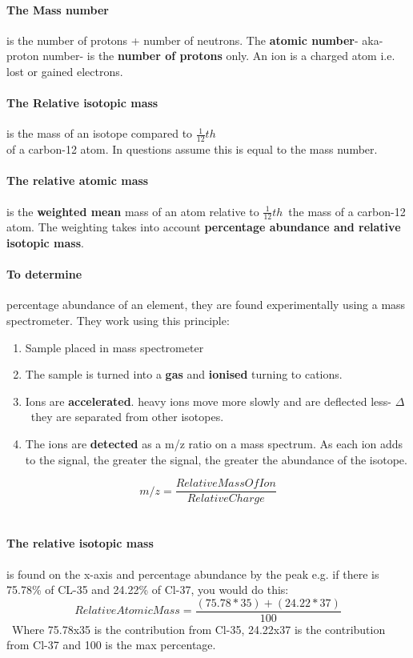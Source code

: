 \paragraph{The Mass number} is the number of protons + number of neutrons. The \textbf{atomic number}- aka- proton number- is the \textbf{number of protons} only.
An ion is a charged atom i.e. lost or gained electrons.
\paragraph{The Relative isotopic mass}is the mass of an isotope compared to \(\frac{1}{12}th\)\\ of a carbon-12 atom. In questions assume this is equal to the mass number.
\paragraph{The relative atomic mass}is the \textbf{weighted mean} mass of an atom relative to  \(\frac{1}{12}th\)\ the mass of a carbon-12 atom. The weighting takes into account \textbf{percentage abundance and relative isotopic mass}. 

\paragraph{To determine} percentage abundance of an element, they are found experimentally using a mass spectrometer. They work using this principle:
\begin{enumerate}
  \item Sample placed in mass spectrometer
  \item The sample is turned into a \textbf{gas} and \textbf{ionised} turning to cations.
  \item Ions are \textbf{accelerated}. heavy ions move more slowly and are deflected less- \(\Delta\)\ they are separated from other isotopes.
  \item The ions are \textbf{detected} as a m/z ratio on a mass spectrum. As each ion adds to the signal, the greater the signal, the greater the abundance of the isotope.
\end{enumerate}
\[m/z= \frac{Relative Mass Of Ion}{Relative Charge}\]\
\paragraph{The relative isotopic mass} is found on the x-axis and percentage abundance by the peak e.g. if there is 75.78\% of CL-35 and 24.22\% of Cl-37, you would do this:
\[Relative Atomic Mass=\frac{(75.78*35)+(24.22*37)}{100}\]\
Where 75.78x35 is the contribution from Cl-35, 24.22x37 is the contribution from Cl-37 and 100 is the max percentage.
